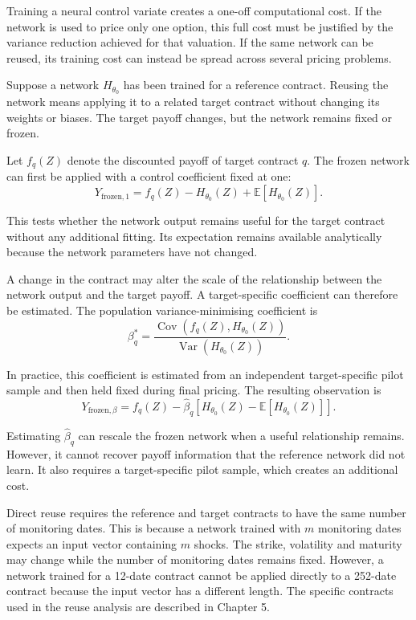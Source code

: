 Training a neural control variate creates a one-off computational cost. If the network is used to price only one option, this full cost must be justified by the variance reduction achieved for that valuation. If the same network can be reused, its training cost can instead be spread across several pricing problems.

Suppose a network \(H_{\theta_0}\) has been trained for a reference contract. Reusing the network means applying it to a related target contract without changing its weights or biases. The target payoff changes, but the network remains fixed or frozen.

Let \(f_q(Z)\) denote the discounted payoff of target contract \(q\). The frozen network can first be applied with a control coefficient fixed at one:
\[
Y_{\mathrm{frozen},1}
=
f_q(Z)
-
H_{\theta_0}(Z)
+
\mathbb{E}
\left[
H_{\theta_0}(Z)
\right].
\]

This tests whether the network output remains useful for the target contract without any additional fitting. Its expectation remains available analytically because the network parameters have not changed.

A change in the contract may alter the scale of the relationship between the network output and the target payoff. A target-specific coefficient can therefore be estimated. The population variance-minimising coefficient is
\[
\beta_q^*
=
\frac{
\operatorname{Cov}
\left(
f_q(Z),H_{\theta_0}(Z)
\right)
}{
\operatorname{Var}
\left(
H_{\theta_0}(Z)
\right)
}.
\]

In practice, this coefficient is estimated from an independent target-specific pilot sample and then held fixed during final pricing. The resulting observation is
\[
Y_{\mathrm{frozen},\beta}
=
f_q(Z)
-
\widehat{\beta}_q
\left[
H_{\theta_0}(Z)
-
\mathbb{E}
\left[
H_{\theta_0}(Z)
\right]
\right].
\]

Estimating \(\widehat{\beta}_q\) can rescale the frozen network when a useful relationship remains. However, it cannot recover payoff information that the reference network did not learn. It also requires a target-specific pilot sample, which creates an additional cost.

Direct reuse requires the reference and target contracts to have the same number of monitoring dates. This is because a network trained with \(m\) monitoring dates expects an input vector containing \(m\) shocks. The strike, volatility and maturity may change while the number of monitoring dates remains fixed. However, a network trained for a 12-date contract cannot be applied directly to a 252-date contract because the input vector has a different length. The specific contracts used in the reuse analysis are described in Chapter 5.
